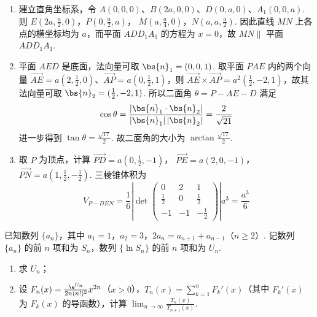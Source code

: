 \begin{solution}
\begin{enumerate}
\item 建立直角坐标系，令 \(A(0,0,0)\)、\(B(2a,0,0)\)、\(D(0,a,0)\)、\(A_1(0,0,a)\). 则
\(E\left(2a,\frac a2,0\right)\)，\(P\left(0,\frac a2,a\right)\)，
\(M\left(a,\frac a4,0\right)\)，\(N\left(a,a,\frac a2\right)\).
因此直线 \(MN\) 上各点的横坐标均为 \(a\)，而平面 \(ADD_1A_1\) 的方程为 \(x=0\)，故 \(MN\parallel\) 平面 \(ADD_1A_1\).
\item 平面 \(AED\) 是底面，法向量可取 \(\bs{n}_1=(0,0,1)\). 取平面 \(PAE\) 内的两个向量 \(\overrightarrow{AE}=a(2,\frac12,0)\)、\(\overrightarrow{AP}=a(0,\frac12,1)\)，则
\(\overrightarrow{AE}\times\overrightarrow{AP}=a^2(\frac12,-2,1)\)，故其法向量可取 \(\bs{n}_2=(\frac12,-2,1)\). 所以二面角 \(\theta=P-AE-D\) 满足
\[
\cos\theta=\frac{|\bs{n}_1\cdot\bs{n}_2|}{|\bs{n}_1|\,|\bs{n}_2|}=\frac{2}{\sqrt{21}}
\]
进一步得到 \(\tan\theta=\frac{\sqrt{17}}{2}\).
故二面角的大小为 \(\arctan\frac{\sqrt{17}}2\).
\item 取 \(P\) 为顶点，计算
\(\overrightarrow{PD}=a\left(0,\frac12,-1\right)\)，
\(\overrightarrow{PE}=a\left(2,0,-1\right)\)，
\(\overrightarrow{PN}=a\left(1,\frac12,-\frac12\right)\).
三棱锥体积为
\[
V_{P-DEN}=\frac16\left|\det\begin{pmatrix}
0&2&1\\
\frac12&0&\frac12\\
-1&-1&-\frac12
\end{pmatrix}\right|a^3=\frac{a^3}{6}
\]
\end{enumerate}
\end{solution}

\begin{problem}
已知数列 \(\{a_n\}\)，其中 \(a_1=1\)，\(a_2=3\)，\(2a_n=a_{n+1}+a_{n-1}\)（\(n\geqslant 2\)）. 记数列 \(\{a_n\}\) 的前 \(n\) 项和为 \(S_n\)，数列 \(\{\ln S_n\}\) 的前 \(n\) 项和为 \(U_n\).

\begin{enumerate}
\item 求 \(U_n\)；
\item 设 \(F_n(x)=\frac{\e^{U_n}}{2n(n!)^2}x^{2n}\)（\(x>0\)），\(T_n(x)=\sum_{k=1}^{n}F_k'(x)\)（其中 \(F_k'(x)\) 为 \(F_k(x)\) 的导函数），计算 \(\displaystyle\lim_{n\to\infty}\frac{T_n(x)}{T_{n+1}(x)}\).
\end{enumerate}
\end{problem}

